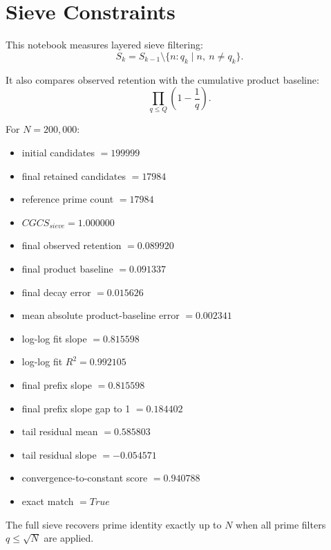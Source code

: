 \section*{Sieve Constraints}

This notebook measures layered sieve filtering:
\[
S_k = S_{k-1} \setminus \{n : q_k \mid n,\ n \ne q_k\}.
\]

It also compares observed retention with the cumulative product baseline:
\[
\prod_{q \le Q}\left(1-\frac{1}{q}\right).
\]

For $N=200,000$:
\begin{itemize}
  \item initial candidates $= 199999$
  \item final retained candidates $= 17984$
  \item reference prime count $= 17984$
  \item $CGCS_{sieve} = 1.000000$
  \item final observed retention $= 0.089920$
  \item final product baseline $= 0.091337$
  \item final decay error $= 0.015626$
  \item mean absolute product-baseline error $= 0.002341$
  \item log-log fit slope $= 0.815598$
  \item log-log fit $R^2 = 0.992105$
  \item final prefix slope $= 0.815598$
  \item final prefix slope gap to 1 $= 0.184402$
  \item tail residual mean $= 0.585803$
  \item tail residual slope $= -0.054571$
  \item convergence-to-constant score $= 0.940788$
  \item exact match $= True$
\end{itemize}

The full sieve recovers prime identity exactly up to $N$ when all prime filters $q \le \sqrt{N}$ are applied.
